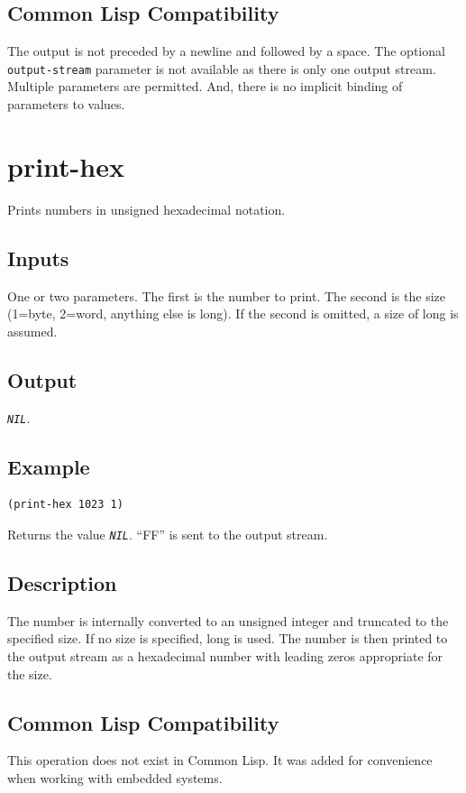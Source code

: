 \documentclass[10pt, openany]{book}
\newcommand{\constant}[1]{\emph{\texttt{#1}}}
\newcommand{\keyword}[1]{\texttt{#1}}
\newcommand{\cl}{Common Lisp}
\begin{document}
\subsection{Common Lisp Compatibility}
The output is not preceded by a newline and followed by a space.  The optional \keyword{output-stream} parameter is not available as there is only one output stream.  Multiple parameters are permitted.  And, there is no implicit binding of parameters to values.

\section{print-hex}
Prints numbers in unsigned hexadecimal notation.
\subsection{Inputs}
One or two parameters.  The first is the number to print.  The second is the size (1=byte, 2=word, anything else is long).  If the second is omitted, a size of long is assumed.
\subsection{Output}
\constant{NIL}.
\subsection{Example}
\begin{lstlisting}
(print-hex 1023 1)
\end{lstlisting}
Returns the value \constant{NIL}.  ``FF'' is sent to the output stream.
\subsection{Description}
The number is internally converted to an unsigned integer and truncated to the specified size.  If no size is specified, long is used.  The number is then printed to the output stream as a hexadecimal number with leading zeros appropriate for the size.
\subsection{Common Lisp Compatibility}
This operation does not exist in \cl.  It was added for convenience when working with embedded systems.

\end{document}
